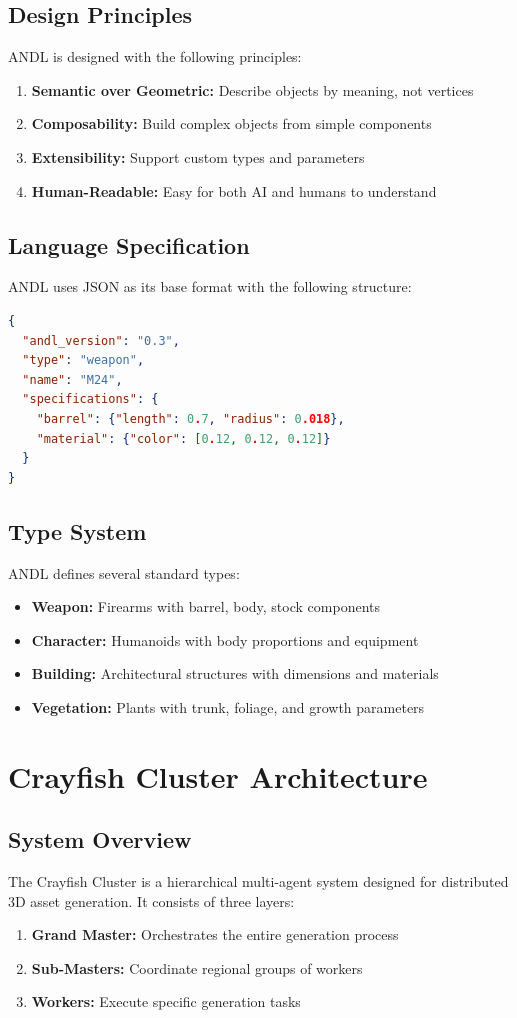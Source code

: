 \documentclass[11pt,a4paper]{article}
\begin{document}
\subsection{Design Principles}
ANDL is designed with the following principles:
\begin{enumerate}
    \item \textbf{Semantic over Geometric:} Describe objects by meaning, not vertices
    \item \textbf{Composability:} Build complex objects from simple components
    \item \textbf{Extensibility:} Support custom types and parameters
    \item \textbf{Human-Readable:} Easy for both AI and humans to understand
\end{enumerate}

\subsection{Language Specification}
ANDL uses JSON as its base format with the following structure:

\begin{lstlisting}[language=json,frame=single]
{
  "andl_version": "0.3",
  "type": "weapon",
  "name": "M24",
  "specifications": {
    "barrel": {"length": 0.7, "radius": 0.018},
    "material": {"color": [0.12, 0.12, 0.12]}
  }
}
\end{lstlisting}

\subsection{Type System}
ANDL defines several standard types:
\begin{itemize}
    \item \textbf{Weapon:} Firearms with barrel, body, stock components
    \item \textbf{Character:} Humanoids with body proportions and equipment
    \item \textbf{Building:} Architectural structures with dimensions and materials
    \item \textbf{Vegetation:} Plants with trunk, foliage, and growth parameters
\end{itemize}

\section{Crayfish Cluster Architecture}
\subsection{System Overview}
The Crayfish Cluster is a hierarchical multi-agent system designed for distributed 3D asset generation. It consists of three layers:
\begin{enumerate}
    \item \textbf{Grand Master:} Orchestrates the entire generation process
    \item \textbf{Sub-Masters:} Coordinate regional groups of workers
    \item \textbf{Workers:} Execute specific generation tasks
\end{enumerate}
\end{document}
